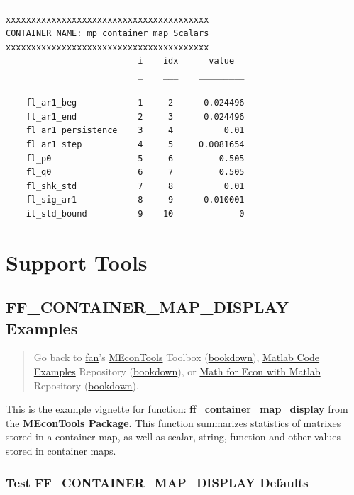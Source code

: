 \documentclass[
]{book}
\begin{document}
\begin{verbatim}
----------------------------------------
xxxxxxxxxxxxxxxxxxxxxxxxxxxxxxxxxxxxxxxx
CONTAINER NAME: mp_container_map Scalars
xxxxxxxxxxxxxxxxxxxxxxxxxxxxxxxxxxxxxxxx
                          i    idx      value  
                          _    ___    _________

    fl_ar1_beg            1     2     -0.024496
    fl_ar1_end            2     3      0.024496
    fl_ar1_persistence    3     4          0.01
    fl_ar1_step           4     5     0.0081654
    fl_p0                 5     6         0.505
    fl_q0                 6     7         0.505
    fl_shk_std            7     8          0.01
    fl_sig_ar1            8     9      0.010001
    it_std_bound          9    10             0
\end{verbatim}

\hypertarget{support-tools}{%
\chapter{Support Tools}\label{support-tools}}

\hypertarget{ff_container_map_display-examples}{%
\section{FF\_CONTAINER\_MAP\_DISPLAY Examples}\label{ff_container_map_display-examples}}

\begin{quote}
Go back to \href{http://fanwangecon.github.io/}{fan}'s \href{https://fanwangecon.github.io/MEconTools/}{MEconTools} Toolbox (\href{https://fanwangecon.github.io/MEconTools/bookdown}{bookdown}), \href{https://fanwangecon.github.io/M4Econ/}{Matlab Code Examples} Repository (\href{https://fanwangecon.github.io/M4Econ/bookdown}{bookdown}), or \href{https://fanwangecon.github.io/Math4Econ/}{Math for Econ with Matlab} Repository (\href{https://fanwangecon.github.io/Math4Econ/bookdown}{bookdown}).
\end{quote}

This is the example vignette for function:
\href{https://github.com/FanWangEcon/MEconTools/blob/master/MEconTools/tools/ff_container_map_display.m}{\textbf{ff\_container\_map\_display}}
from the \href{https://fanwangecon.github.io/MEconTools/}{\textbf{MEconTools
Package}}\textbf{.} This function
summarizes statistics of matrixes stored in a container map, as well as
scalar, string, function and other values stored in container maps.

\hypertarget{test-ff_container_map_display-defaults}{%
\subsection{Test FF\_CONTAINER\_MAP\_DISPLAY Defaults}\label{test-ff_container_map_display-defaults}}
\end{document}
